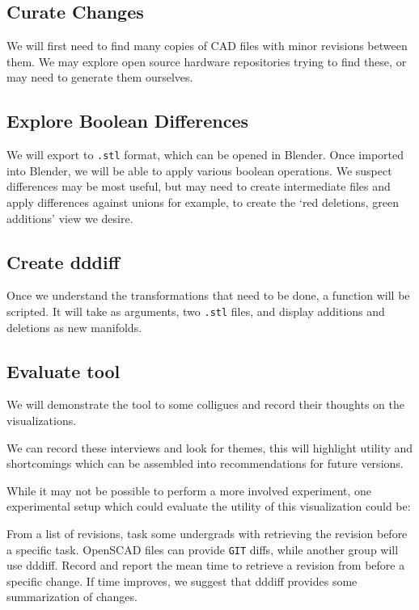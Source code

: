 \documentclass[sigconf,]{acmart}
\begin{document}

\subsection{Curate Changes}

We will first need to find many copies of CAD files with minor revisions between them.
We may explore open source hardware repositories trying to find these, or may need to generate them ourselves.

\subsection{Explore Boolean Differences}

We will export to \texttt{.stl} format, which can be opened in Blender.
Once imported into Blender, we will be able to apply various boolean operations.
We suspect differences may be most useful, but may need to create intermediate files and apply differences against unions for example, to create the `red deletions, green additions' view we desire.

\subsection{Create dddiff}

Once we understand the transformations that need to be done, a function will be scripted.
It will take as arguments, two \texttt{.stl} files, and display additions and deletions as new manifolds.

\subsection{Evaluate tool}

We will demonstrate the tool to some colligues and record their thoughts on the visualizations.

We can record these interviews and look for themes, this will highlight utility and shortcomings which can be assembled into recommendations for future versions.

While it may not be possible to perform a more involved experiment,
one experimental setup which could evaluate the utility of this visualization could be:

From a list of revisions, task some undergrads with retrieving the revision before a specific task.
OpenSCAD files can provide \texttt{GIT} diffs, while another group will use dddiff.
Record and report the mean time to retrieve a revision from before a specific change.
If time improves, we suggest that dddiff provides some summarization of changes.
\end{document}
